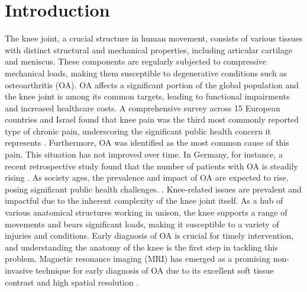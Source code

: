 \documentclass{micro-econ-thesis}
\begin{document}

\cleardoublepage
\pagestyle{headings}
\setcounter{page}{1}
\onehalfspacing %

\section{Introduction}

The knee joint, a crucial structure in human movement, consists of various tissues with distinct structural and mechanical properties, including articular cartilage and meniscus. These components are regularly subjected to compressive mechanical loads, making them susceptible to degenerative conditions such as osteoarthritis (OA). OA affects a significant portion of the global population and the knee joint is among its common targets, leading to functional impairments and increased healthcare costs. \parencite{WHO} A comprehensive survey across 15 European countries and Israel found that knee pain was the third most commonly reported type of chronic pain, underscoring the significant public health concern it represents \parencite{breivik_survey_2006}. Furthermore, OA was identified as the most common cause of this pain. This situation has not improved over time. In Germany, for instance, a recent retrospective study found that the number of patients with OA is steadily rising \parencite{obermuller_epidemiology_2024}. As society ages, the prevalence and impact of OA are expected to rise, posing significant public health challenges. \parencite{yelin_burden_2016}. Knee-related issues are prevalent and impactful due to the inherent complexity of the knee joint itself. As a hub of various anatomical structures working in unison, the knee supports a range of movements and bears significant loads, making it susceptible to a variety of injuries and conditions. Early diagnosis of OA is crucial for timely intervention, and understanding the anatomy of the knee is the first step in tackling this problem. Magnetic resonance imaging (MRI) has emerged as a promising non-invasive technique for early diagnosis of OA due to its excellent soft tissue contrast and high spatial resolution \parencite{kijowski_osteoarthritis_2020}. 
\end{document}

